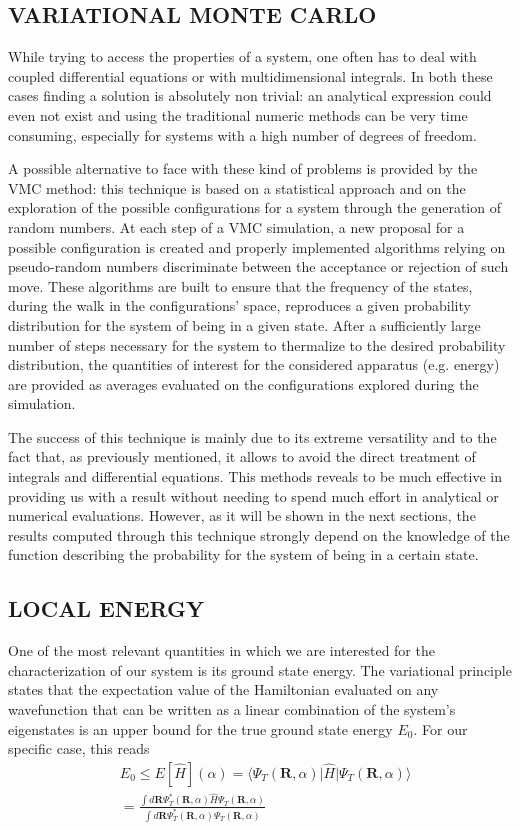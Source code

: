 \subsection{VARIATIONAL MONTE CARLO}
While trying to access the properties of a system, one often has to deal with coupled differential equations or with multidimensional integrals. In both these cases finding a solution is absolutely non trivial: an analytical expression could even not exist and using the traditional numeric methods can be very time consuming, especially for systems with a high number of degrees of freedom.

A possible alternative to face with these kind of problems is provided by the VMC method: this technique is based on a statistical approach and on the exploration of the possible configurations for a system through the generation of random numbers. At each step of a VMC simulation, a new proposal for a possible configuration is created and properly implemented algorithms relying on pseudo-random numbers discriminate between the acceptance or rejection of such move. These algorithms are built to ensure that the frequency of the states, during the walk in the configurations' space, reproduces a given probability distribution for the system of being in a given state. After a sufficiently large number of steps necessary for the system to thermalize to the desired probability distribution, the quantities of interest for the considered apparatus (e.g. energy) are provided as averages evaluated on the configurations explored during the simulation. 

The success of this technique is mainly due to its extreme versatility and to the fact that, as previously mentioned, it allows to avoid the direct treatment of integrals and differential equations. This methods reveals to be much effective in providing us with a result without needing to spend much effort in analytical or numerical evaluations. However, as it will be shown in the next sections, the results computed through this technique strongly depend on the knowledge of the function describing the probability for the system of being in a certain state. 



\subsection{LOCAL ENERGY}
One of the most relevant quantities in which we are interested for the characterization of our system is its ground state energy. The variational principle states that the expectation value of the Hamiltonian evaluated on any wavefunction that can be written as a linear combination of the system's eigenstates is an upper bound for the true ground state energy $E_0$. For our specific case, this reads 
\begin{align*}
    &E_0 \leq E [ \hat{H} ](\alpha) = \langle \Psi_T(\bm{R}, \alpha) \vert \hat{H} \vert \Psi_T(\bm{R}, \alpha) \rangle \\
    &= \frac{\int d\bm{R} \Psi_T^*(\bm{R}, \alpha) \hat{H} \Psi_T(\bm{R}, \alpha) }{\int d\bm{R} \Psi_T^*(\bm{R}, \alpha) \Psi_T(\bm{R}, \alpha)}
\end{align*}


